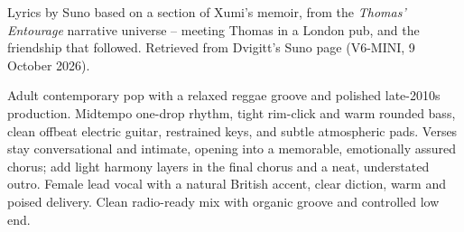 
\begin{notes}
Lyrics by Suno based on a section of Xumi's memoir, from the \emph{Thomas' Entourage} narrative universe -- meeting Thomas in a London pub, and the friendship that followed. Retrieved from Dvigitt's Suno page (V6-MINI, 9 October 2026).
\end{notes}
\begin{style}
Adult contemporary pop with a relaxed reggae groove and polished late-2010s production. Midtempo one-drop rhythm, tight rim-click and warm rounded bass, clean offbeat electric guitar, restrained keys, and subtle atmospheric pads. Verses stay conversational and intimate, opening into a memorable, emotionally assured chorus; add light harmony layers in the final chorus and a neat, understated outro. Female lead vocal with a natural British accent, clear diction, warm and poised delivery. Clean radio-ready mix with organic groove and controlled low end.
\end{style}
